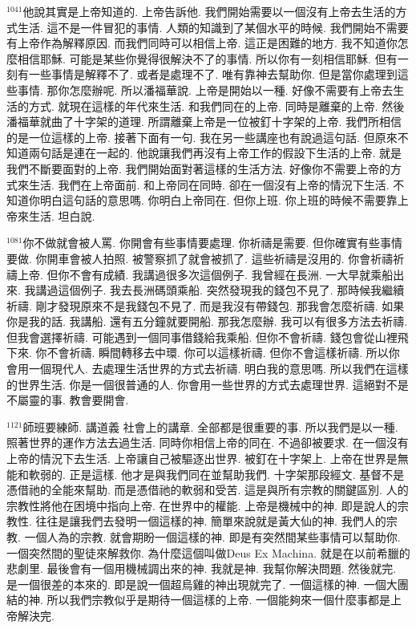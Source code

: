 \documentclass{book}
\begin{document}
$^{1041}$他說其實是上帝知道的.
上帝告訴他.
我們開始需要以一個沒有上帝去生活的方式生活.
這不是一件冒犯的事情.
人類的知識到了某個水平的時候.
我們開始不需要有上帝作為解釋原因.
而我們同時可以相信上帝.
這正是困難的地方.
我不知道你怎麼相信耶穌.
可能是某些你覺得很解決不了的事情.
所以你有一刻相信耶穌.
但有一刻有一些事情是解釋不了.
或者是處理不了.
唯有靠神去幫助你.
但是當你處理到這些事情.
那你怎麼辦呢.
所以潘福華說.
上帝是開始以一種.
好像不需要有上帝去生活的方式.
就現在這樣的年代來生活.
和我們同在的上帝.
同時是離棄的上帝.
然後潘福華就曲了十字架的道理.
所謂離棄上帝是一位被釘十字架的上帝.
我們所相信的是一位這樣的上帝.
接著下面有一句.
我在另一些講座也有說過這句話.
但原來不知道兩句話是連在一起的.
他說讓我們再沒有上帝工作的假設下生活的上帝.
就是我們不斷要面對的上帝.
我們開始面對著這樣的生活方法.
好像你不需要上帝的方式來生活.
我們在上帝面前.
和上帝同在同時.
卻在一個沒有上帝的情況下生活.
不知道你明白這句話的意思嗎.
你明白上帝同在.
但你上班.
你上班的時候不需要靠上帝來生活.
坦白說.

$^{1081}$你不做就會被人罵.
你開會有些事情要處理.
你祈禱是需要.
但你確實有些事情要做.
你開車會被人拍照.
被警察抓了就會被抓了.
這些祈禱是沒用的.
你會祈禱祈禱上帝.
但你不會有成績.
我講過很多次這個例子.
我曾經在長洲.
一大早就乘船出來.
我講過這個例子.
我去長洲碼頭乘船.
突然發現我的錢包不見了.
那時候我繼續祈禱.
剛才發現原來不是我錢包不見了.
而是我沒有帶錢包.
那我會怎麼祈禱.
如果你是我的話.
我講船.
還有五分鐘就要開船.
那我怎麼辦.
我可以有很多方法去祈禱.
但我會選擇祈禱.
可能遇到一個同事借錢給我乘船.
但你不會祈禱.
錢包會從山裡飛下來.
你不會祈禱.
瞬間轉移去中環.
你可以這樣祈禱.
但你不會這樣祈禱.
所以你會用一個現代人.
去處理生活世界的方式去祈禱.
明白我的意思嗎.
所以我們在這樣的世界生活.
你是一個很普通的人.
你會用一些世界的方式去處理世界.
這絕對不是不屬靈的事.
教會要開會.

$^{1121}$師班要練師.
講道義 社會上的講章.
全部都是很重要的事.
所以我們是以一種.
照著世界的運作方法去過生活.
同時你相信上帝的同在.
不過卻被要求.
在一個沒有上帝的情況下去生活.
上帝讓自己被驅逐出世界.
被釘在十字架上.
上帝在世界是無能和軟弱的.
正是這樣.
他才是與我們同在並幫助我們.
十字架那段經文.
基督不是憑借祂的全能來幫助.
而是憑借祂的軟弱和受苦.
這是與所有宗教的關鍵區別.
人的宗教性將他在困境中指向上帝.
在世界中的權能.
上帝是機械中的神.
即是說人的宗教性.
往往是讓我們去發明一個這樣的神.
簡單來說就是黃大仙的神.
我們人的宗教.
一個人為的宗教.
就會期盼一個這樣的神.
即是有突然間某些事情可以幫助你.
一個突然間的聖徒來解救你.
為什麼這個叫做Deus Ex Machina.
就是在以前希臘的悲劇里.
最後會有一個用機械調出來的神.
我就是神.
我幫你解決問題.
然後就完.
是一個很差的本來的.
即是說一個超烏雞的神出現就完了.
一個這樣的神.
一個大團結的神.
所以我們宗教似乎是期待一個這樣的上帝.
一個能夠來一個什麼事都是上帝解決完.
\end{document}
